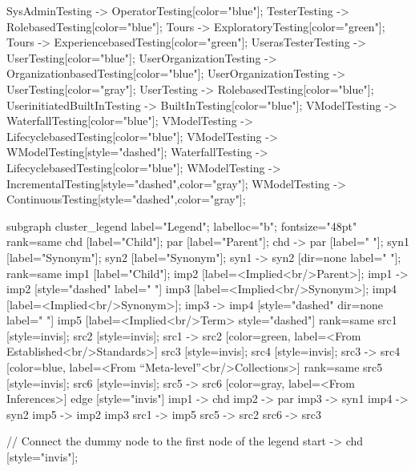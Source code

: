 \documentclass{article}
\begin{document}
{SysAdminTesting -> OperatorTesting[color="blue"];
TesterTesting -> RolebasedTesting[color="blue"];
Tours -> ExploratoryTesting[color="green"];
Tours -> ExperiencebasedTesting[color="green"];
UserasTesterTesting -> UserTesting[color="blue"];
UserOrganizationTesting -> OrganizationbasedTesting[color="blue"];
UserOrganizationTesting -> UserTesting[color="gray"];
UserTesting -> RolebasedTesting[color="blue"];
UserinitiatedBuiltInTesting -> BuiltInTesting[color="blue"];
VModelTesting -> WaterfallTesting[color="blue"];
VModelTesting -> LifecyclebasedTesting[color="blue"];
VModelTesting -> WModelTesting[style="dashed"];
WaterfallTesting -> LifecyclebasedTesting[color="blue"];
WModelTesting -> IncrementalTesting[style="dashed",color="gray"];
WModelTesting -> ContinuousTesting[style="dashed",color="gray"];

subgraph cluster_legend {
    label="Legend";
    labelloc="b";
    fontsize="48pt"
    {
        rank=same
        chd [label="Child"];
        par [label="Parent"];
        chd -> par [label="                "];
        syn1 [label="Synonym"];
        syn2 [label="Synonym"];
        syn1 -> syn2 [dir=none label="                "];
    }
    {
        rank=same
        imp1 [label="Child"];
        imp2 [label=<Implied<br/>Parent>];
        imp1 -> imp2 [style="dashed" label="                "]
        imp3 [label=<Implied<br/>Synonym>];
        imp4 [label=<Implied<br/>Synonym>];
        imp3 -> imp4 [style="dashed" dir=none label="                "]
    }
        imp5 [label=<Implied<br/>Term> style="dashed"]
{
rank=same
src1 [style=invis];
src2 [style=invis];
src1 -> src2 [color=green, label=<From Established<br/>Standards>]
src3 [style=invis];
src4 [style=invis];
src3 -> src4 [color=blue, label=<From ``Meta-level''<br/>Collections>]
}
{
rank=same
src5 [style=invis];
src6 [style=invis];
src5 -> src6 [color=gray, label=<From Inferences>]
}
    edge [style="invis"]
    imp1 -> chd
    imp2 -> par
    imp3 -> syn1
    imp4 -> syn2
imp5 -> { imp2 imp3 }
src1 -> imp5
src5 -> src2
src6 -> src3
}

// Connect the dummy node to the first node of the legend
start -> chd [style="invis"];
}
\end{document}
